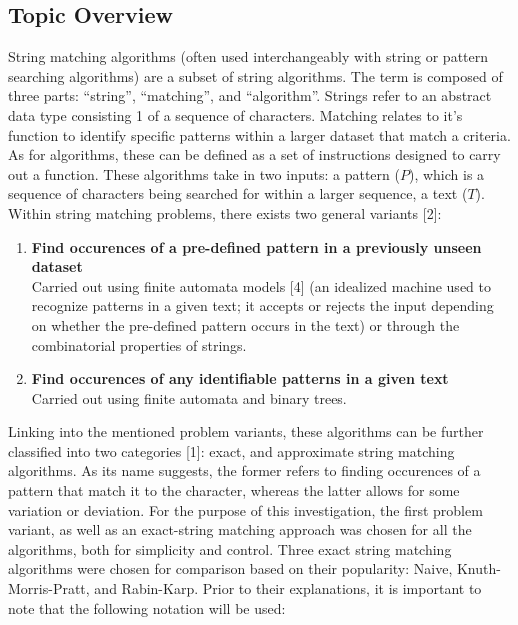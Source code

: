 \documentclass[12pt]{article}
\begin{document}
\subsection{Topic Overview}
String matching algorithms (often used interchangeably with string or pattern searching
algorithms) are a subset of string algorithms. The term is composed of three parts:
“string”, “matching”, and “algorithm”. Strings refer to an abstract data type consisting
1
of a sequence of characters. Matching relates to it's function to identify specific patterns
within a larger dataset that match a criteria. As for algorithms, these can be defined as a set of instructions designed to carry out a function. These algorithms take in two
inputs: a pattern ($P$), which is a sequence of characters being searched for within a larger
sequence, a text ($T$). Within string matching problems, there exists two general variants
[2]:

\begin{enumerate}
	\item \textbf{Find occurences of a pre-defined pattern in a previously unseen dataset} \\
	Carried out using finite automata models [4] (an idealized machine used to recognize
	patterns in a given text; it accepts or rejects the input depending on whether the
	pre-defined pattern occurs in the text) or through the combinatorial properties of
	strings.
	\item \textbf{Find occurences of any identifiable patterns in a given text} \\
	Carried out using finite automata and binary trees.
\end{enumerate}

Linking into the mentioned problem variants, these algorithms can be further classified into two categories [1]: exact, and approximate string matching algorithms. As
its name suggests, the former refers to finding occurences of a pattern that match it to
the character, whereas the latter allows for some variation or deviation. For the purpose
of this investigation, the first problem variant, as well as an exact-string matching approach was chosen for all the algorithms, both for simplicity and control. Three exact
string matching algorithms were chosen for comparison based on their popularity: Naive,
Knuth-Morris-Pratt, and Rabin-Karp. Prior to their explanations, it is important to note
that the following notation will be used:
\end{document}
